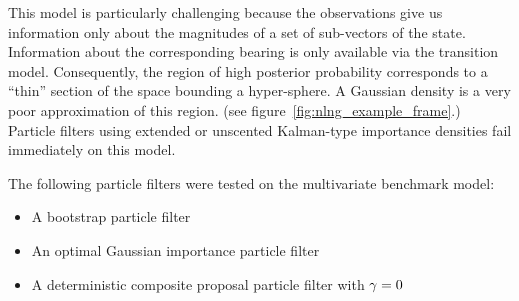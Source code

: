 \documentclass{article}
\begin{document}
This model is particularly challenging because the observations give us information only about the magnitudes of a set of sub-vectors of the state. Information about the corresponding bearing is only available via the transition model. Consequently, the region of high posterior probability corresponds to a ``thin'' section of the space bounding a hyper-sphere. A Gaussian density is a very poor approximation of this region. (see figure~\ref{fig:nlng_example_frame}.) Particle filters using extended or unscented Kalman-type importance densities fail immediately on this model.

The following particle filters were tested on the multivariate benchmark model:
\begin{itemize}
  \item A bootstrap particle filter
  \item An optimal Gaussian importance particle filter
  \item A deterministic composite proposal particle filter with $\gamma=0$
\end{itemize}
\end{document}
